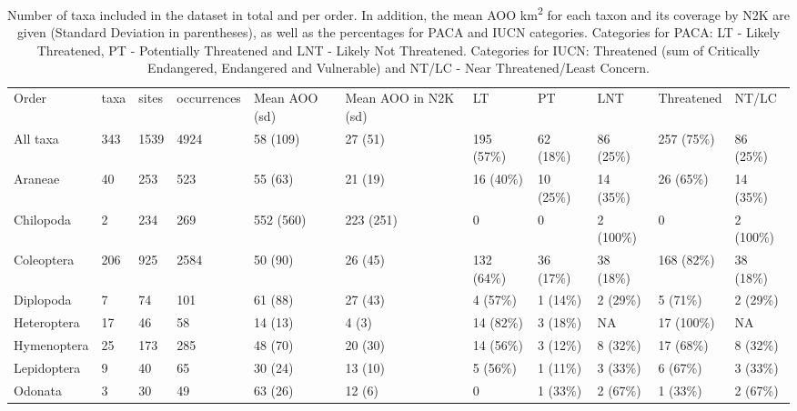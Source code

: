 \begin{sidewaystable}
\caption{Number of taxa included in the dataset in total and per order. In addition, the mean AOO km\textsuperscript{2} for each taxon and its coverage by N2K are given (Standard Deviation in parentheses), as well as the percentages for PACA and IUCN categories. Categories for PACA: LT - Likely Threatened, PT - Potentially Threatened and LNT - Likely Not Threatened. Categories for IUCN: Threatened (sum of Critically Endangered, Endangered and Vulnerable) and NT/LC - Near Threatened/Least Concern.}
\begin{tabular}{lllllllllll}
Order                        & taxa & sites & occurrences & Mean AOO (sd)     & Mean AOO in N2K (sd)        & LT         & PT        & LNT       & Threatened & NT/LC     \\
All taxa                     & 343  & 1539  & 4924        & 58 (109)          & 27 (51)                  & 195 (57\%) & 62 (18\%) & 86 (25\%) & 257 (75\%) & 86 (25\%) \\
Araneae                      & 40   & 253   & 523         & 55 (63)           & 21 (19)                  & 16 (40\%)  & 10 (25\%) & 14 (35\%) & 26 (65\%)  & 14 (35\%) \\
Chilopoda                    & 2    & 234   & 269         & 552 (560)         & 223 (251)                & 0          & 0         & 2 (100\%) & 0          & 2 (100\%) \\
Coleoptera                   & 206  & 925   & 2584        & 50 (90)           & 26 (45)                  & 132 (64\%) & 36 (17\%) & 38 (18\%) & 168 (82\%) & 38 (18\%) \\
Diplopoda                    & 7    & 74    & 101         & 61 (88)           & 27 (43)                  & 4 (57\%)   & 1 (14\%)  & 2 (29\%)  & 5 (71\%)   & 2 (29\%)  \\
Heteroptera                  & 17   & 46    & 58          & 14 (13)           & 4 (3)                    & 14 (82\%)  & 3 (18\%)  & NA        & 17 (100\%) & NA        \\
Hymenoptera                  & 25   & 173   & 285         & 48 (70)           & 20 (30)                  & 14 (56\%)  & 3 (12\%)  & 8 (32\%)  & 17 (68\%)  & 8 (32\%)  \\
Lepidoptera                  & 9    & 40    & 65          & 30 (24)           & 13 (10)                  & 5 (56\%)   & 1 (11\%)  & 3 (33\%)  & 6 (67\%)   & 3 (33\%)  \\
Odonata                      & 3    & 30    & 49          & 63 (26)           & 12 (6)                   & 0          & 1 (33\%)  & 2 (67\%)  & 1 (33\%)   & 2 (67\%)  \\

\end{tabular}
\end{sidewaystable}
